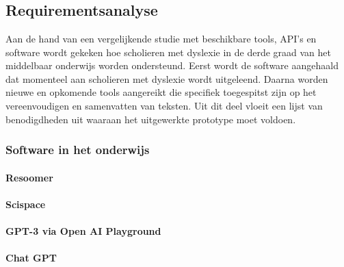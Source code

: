 
\chapter{}%
\label{ch:methodologie}


\section{Requirementsanalyse}

Aan de hand van een vergelijkende studie met beschikbare tools, API's en software wordt gekeken hoe scholieren met dyslexie in de derde graad van het middelbaar onderwijs worden ondersteund. Eerst wordt de software aangehaald dat momenteel aan scholieren met dyslexie wordt uitgeleend. Daarna worden nieuwe en opkomende tools aangereikt die specifiek toegespitst zijn op het vereenvoudigen en samenvatten van teksten. Uit dit deel vloeit een lijst van benodigdheden uit waaraan het uitgewerkte prototype moet voldoen.

\subsection{Software in het onderwijs}

\subsubsection{Resoomer}

\subsubsection{Scispace}

\subsubsection{GPT-3 via Open AI Playground}

\subsubsection{Chat GPT}

